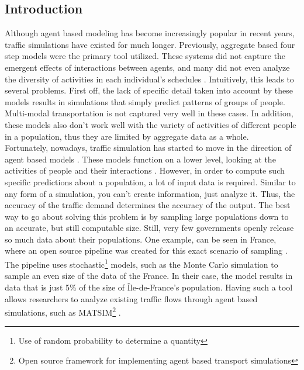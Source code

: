 \documentclass[11pt]{article}
\begin{document}
\begin{multicols}{2}
    \section{Introduction}
    \quad Although agent based modeling has become increasingly popular in recent years, traffic simulations have existed for much longer. Previously, aggregate based four step models were the primary tool utilized. These systems did not capture the emergent effects of interactions between agents, and many did not even analyze the diversity of activities in each individual's schedules \cite{types-of-modeling}. Intuitively, this leads to several problems. First off, the lack of specific detail taken into account by these models results in simulations that simply predict patterns of groups of people. Multi-modal transportation is not captured very well in these cases. In addition, these models also don't work well with the variety of activities of different people in a population, thus they are limited by aggregate data as a whole. \\

    \quad Fortunately, nowadays, traffic simulation has started to move in the direction of agent based models \cite{ile-de-france}. These models function on a lower level, looking at the activities of people and their interactions \cite{agent-based-model}. However, in order to compute such specific predictions about a population, a lot of input data is required. Similar to any form of a simulation, you can't create information, just analyze it. Thus, the accuracy of the traffic demand determines the accuracy of the output. The best way to go about solving this problem is by sampling large populations down to an accurate, but still computable size. Still, very few governments openly release so much data about their populations. One example, can be seen in France, where an open source pipeline was created for this exact scenario of sampling \cite{ile-de-france}. The pipeline uses stochastic\footnote{Use of random probability to determine a quantity} models, such as the Monte Carlo simulation to sample an even size of the data of the France. In their case, the model results in data that is just 5\% of the size of Île-de-France's population. Having such a tool allows researchers to analyze existing traffic flows through agent based simulations, such as MATSIM\footnote{Open source framework for implementing agent based transport simulations} \cite{matsim}.\\


\end{multicols}
\end{document}
